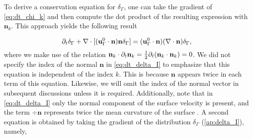 To derive a conservation equation for $\delta_\Gamma$, one can take the gradient of \ref{eq:dt_chi_k} and then compute the dot product of the resulting expression with $\textbf{n}_k$. This approach yields the following result \citep{marle1982macroscopic,drew1990,lhuillier2000bilan,junqua2003}

\begin{equation}
    \pddt \delta_\Gamma
    + \div [(\textbf{u}_\Gamma^0\cdot \textbf{n}) \textbf{n}\delta_\Gamma ]
    = (\textbf{u}_\Gamma^0 \cdot \textbf{n})(\div\textbf{n}) \delta_\Gamma ,
    \label{eq:dt_delta_I}
\end{equation} 
where we make use of the relation $\textbf{n}_k\cdot \partial_t\textbf{n}_k= \frac{1}{2}\partial_t(\textbf{n}_k\cdot \textbf{n}_k) = 0$. 
We did not specify the index of the normal $\textbf{n}$ in \ref{eq:dt_delta_I} to emphasize that this equation is independent of the index $k$. This is because $\textbf{n}$ appears twice in each term of this equation. 
Likewise, we will omit the index of the normal vector in subsequent discussions unless it is required. %
Additionally, note that in \ref{eq:dt_delta_I} only the normal component of the surface velocity is present, and the term $\div \textbf{n}$ represents twice the mean curvature of the surface \citep{aris2012vectors}.  %
A second equation is obtained by taking the gradient of the distribution $\delta_\Gamma $ (\ref{ap:delta_I}), namely, 
